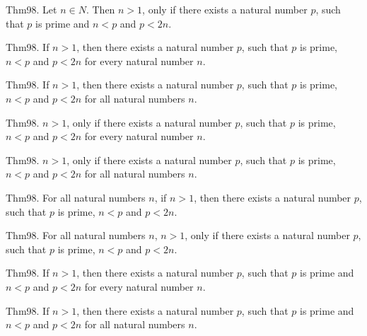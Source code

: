 \documentclass{article}
\begin{document}
Thm98. Let $n \in N$. Then $n > 1$, only if there exists a natural number $p$, such that $p$ is prime and $n < p$ and $p < 2 n$.

Thm98. If $n > 1$, then there exists a natural number $p$, such that $p$ is prime, $n < p$ and $p < 2 n$ for every natural number $n$.

Thm98. If $n > 1$, then there exists a natural number $p$, such that $p$ is prime, $n < p$ and $p < 2 n$ for all natural numbers $n$.

Thm98. $n > 1$, only if there exists a natural number $p$, such that $p$ is prime, $n < p$ and $p < 2 n$ for every natural number $n$.

Thm98. $n > 1$, only if there exists a natural number $p$, such that $p$ is prime, $n < p$ and $p < 2 n$ for all natural numbers $n$.

Thm98. For all natural numbers $n$, if $n > 1$, then there exists a natural number $p$, such that $p$ is prime, $n < p$ and $p < 2 n$.

Thm98. For all natural numbers $n$, $n > 1$, only if there exists a natural number $p$, such that $p$ is prime, $n < p$ and $p < 2 n$.

Thm98. If $n > 1$, then there exists a natural number $p$, such that $p$ is prime and $n < p$ and $p < 2 n$ for every natural number $n$.

Thm98. If $n > 1$, then there exists a natural number $p$, such that $p$ is prime and $n < p$ and $p < 2 n$ for all natural numbers $n$.
\end{document}
